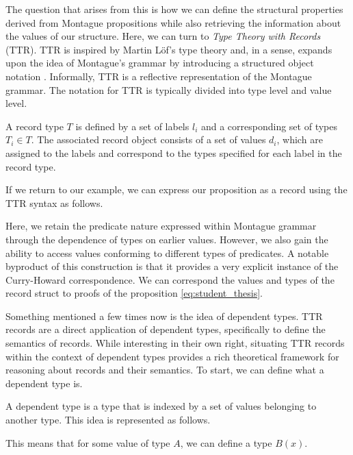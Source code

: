 The question that arises from this is how we can define the structural properties derived from Montague propositions while also retrieving the information about the values of our structure. Here, we can turn to \textit{Type Theory with Records} (TTR). TTR is inspired by Martin Löf's type theory and, in a sense, expands upon the idea of Montague's grammar by introducing a structured object notation \cite{Cooper2005Records, cooper2021structure}. Informally, TTR is a reflective representation of the Montague grammar. The notation for TTR is typically divided into type level and value level.

\begin{definition}
A record type \( T \) is defined by a set of labels \( l_i \) and a corresponding set of types \( T_i \in T \). The associated record object consists of a set of values \( d_i \), which are assigned to the labels and correspond to the types specified for each label in the record type.

  

\end{definition}

\begin{example}

If we return to our example, we can express our proposition as a record using the TTR syntax as follows.



Here, we retain the predicate nature expressed within Montague grammar through the dependence of types on earlier values. However, we also gain the ability to access values conforming to different types of predicates. A notable byproduct of this construction is that it provides a very explicit instance of the Curry-Howard correspondence. We can correspond the values and types of the record struct to proofs of the proposition \ref{eq:student_thesis}. 

\end{example}

Something mentioned a few times now is the idea of dependent types. TTR records are a direct application of dependent types, specifically to define the semantics of records. While interesting in their own right, situating TTR records within the context of dependent types provides a rich theoretical framework for reasoning about records and their semantics. To start, we can define what a dependent type is.

\begin{definition}
 A dependent type is a type that is indexed by a set of values belonging to another type. This idea is represented as follows.

  

 This means that for some value of type $A$, we can define a type $B(x)$.
\end{definition}

